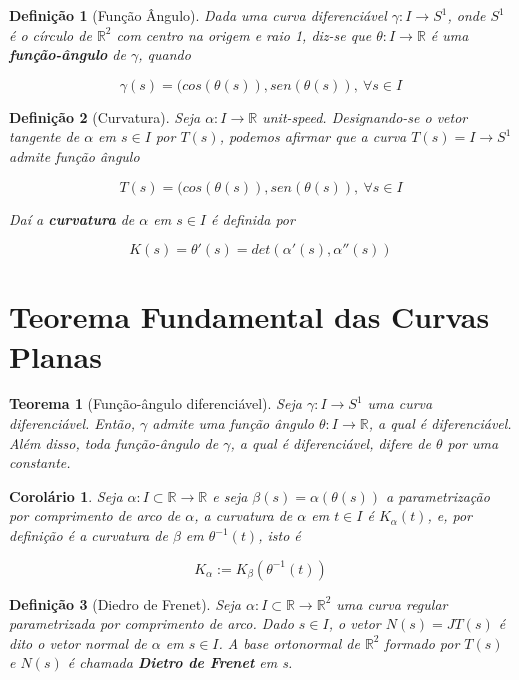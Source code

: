 \documentclass{article}
\newtheorem{theorem}{Teorema}
\newtheorem{corollary}{Corolário}[theorem]
\newtheorem{definition}{Definição}
\begin{document}
\begin{definition}[Função Ângulo]
Dada uma curva diferenciável $\gamma: I \rightarrow S^1$, onde $S^1$ é o círculo de $\mathbb{R}^2$ com centro na origem e raio 1, diz-se que $\theta: I \rightarrow \mathbb{R}$ é uma \textbf{função-ângulo} de $\gamma$, quando

$$\gamma(s) = (cos(\theta(s)), sen(\theta(s)),\ \forall s \in I$$
\end{definition}

\begin{definition}[Curvatura]
Seja $\alpha: I \rightarrow \mathbb{R}$ unit-speed. Designando-se o vetor tangente de $\alpha$ em $s \in I$ por $T(s)$, podemos afirmar que a curva $T(s) = I \rightarrow S^1$ admite função ângulo

$$T(s) = (cos(\theta(s)), sen(\theta(s)),\ \forall s \in I$$

Daí a \textbf{curvatura} de $\alpha$ em $s \in I$ é definida por

$$K(s) = \theta'(s) = det(\alpha'(s), \alpha''(s))$$
\end{definition}

\section*{Teorema Fundamental das Curvas Planas}
\label{s4}

\begin{theorem}[Função-ângulo diferenciável]
Seja $\gamma: I \rightarrow S^1$ uma curva diferenciável. Então, $\gamma$ admite uma função ângulo $\theta: I \rightarrow \mathbb{R}$, a qual é diferenciável. Além disso, toda função-ângulo de $\gamma$, a qual é diferenciável, difere de $\theta$ por uma constante.
\end{theorem}

\begin{corollary}
Seja $\alpha : I \subset \mathbb{R} \rightarrow \mathbb{R}$ e seja $\beta(s) = \alpha(\theta(s))$ a parametrização por comprimento de arco de $\alpha$, a curvatura de $\alpha$ em $t \in I$ é $K_\alpha(t)$, e, por definição é a curvatura de $\beta$ em $\theta^{-1}(t)$, isto é

$$K_\alpha := K_\beta(\theta^{-1}(t))$$
\end{corollary}

\begin{definition}[Diedro de Frenet]
Seja $\alpha: I \subset \mathbb{R} \rightarrow \mathbb{R}^2$ uma curva regular parametrizada por comprimento de arco. Dado $s \in I$, o vetor $N(s) = JT(s)$ é dito o vetor normal de $\alpha$ em $s \in I$. A base ortonormal de $\mathbb{R}^2$ formado por $T(s)$ e $N(s)$ é chamada \textbf{Dietro de Frenet} em s.
\end{definition}
\end{document}
